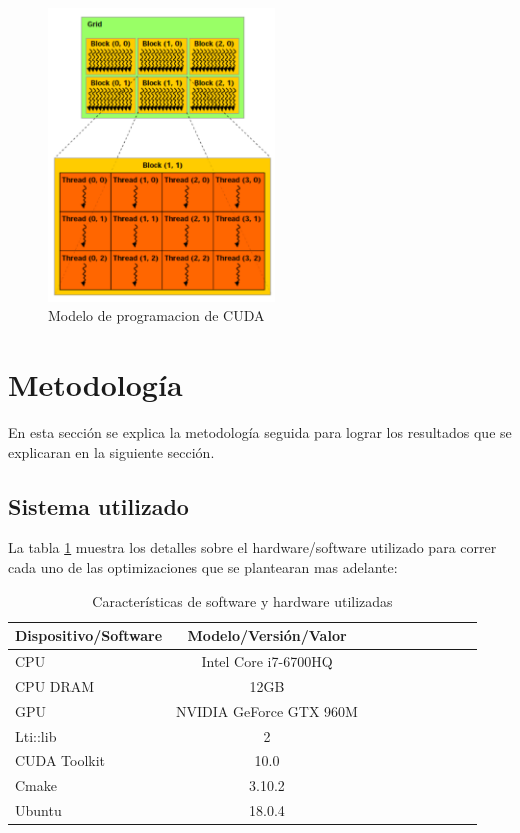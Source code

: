 \documentclass[conference]{IEEEtran}
\begin{document}
\begin{figure}[H]
\centering
\includegraphics[width=6cm]{cuda_model}
\caption{Modelo de programacion de CUDA \cite{cuda_by_example}}
\label{cuda_model}
\end{figure}

\section{\textbf{Metodología}}
En esta sección se explica la metodología seguida para lograr los resultados que se explicaran en la siguiente sección.
\subsection{\textbf{Sistema utilizado}}
La tabla \ref{table_hrdware_software} muestra los detalles sobre el hardware/software utilizado para correr cada uno de las optimizaciones que se plantearan mas adelante:
\begin{table}[h]
\caption{Características de software y hardware utilizadas} %
\centering %
\begin{tabular}{l c c rrrrrrr} %
\hline\hline %
 Dispositivo/Software & Modelo/Versión/Valor\\ [0.5ex]
\hline %
CPU & Intel Core i7-6700HQ\\[0.5ex]
CPU DRAM & 12GB\\[0.5ex]
GPU & NVIDIA GeForce GTX 960M\\[0.5ex]
Lti::lib & 2\\ [0.5ex]%
CUDA Toolkit & 10.0\\[0.5ex]
Cmake & 3.10.2\\[0.5ex]
Ubuntu & 18.0.4 \\[0.5ex]
\hline %
\end{tabular}
\label{table_hrdware_software}
\end{table}
\end{document}
